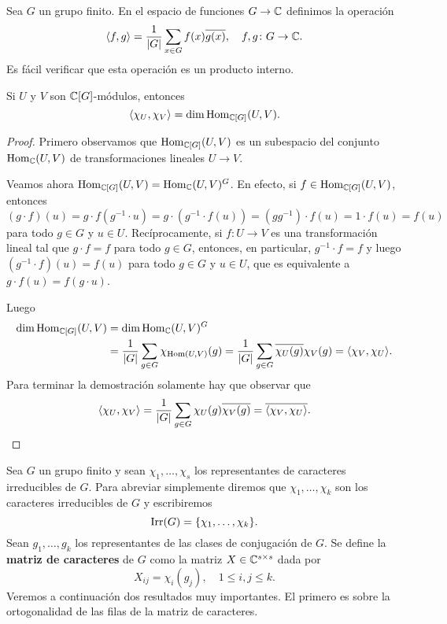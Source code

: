 Sea $G$ un grupo finito. En el espacio de funciones $G\to\mathbb{C}$ definimos la operación
\[
\langle f,g\rangle=\frac{1}{|G|}\sum_{x\in G}f(x)\overline{g(x)},
\quad f,g\colon G\to\mathbb{C}.
\]
Es fácil verificar que esta operación es un producto interno. 

\begin{theorem}
Si $U$ y $V$ son $\mathbb{C}[G]$-módulos, entonces 
\[
\langle\chi_U,\chi_V\rangle=\dim\operatorname{Hom}_{\mathbb{C}[G]}(U,V).
\]
\end{theorem}

\begin{proof}
    Primero observamos que $\operatorname{Hom}_{\mathbb{C}[G]}(U,V)$ es un subespacio del conjunto $\operatorname{Hom}_{\mathbb{C}}(U,V)$ de transformaciones lineales $U\to V$.
    
    Veamos ahora $\operatorname{Hom}_{\mathbb{C}[G]}(U,V)=\operatorname{Hom}_{\mathbb{C}}(U,V)^G$. En efecto, si $f\in\operatorname{Hom}_{\mathbb{C}[G]}(U,V)$, entonces
    \[
    (g\cdot f)(u)=g\cdot f(g^{-1}\cdot u)=g\cdot (g^{-1}\cdot f(u))=(gg^{-1})\cdot f(u)=1\cdot f(u)=f(u)
    \]
    para todo $g\in G$ y $u\in U$. Recíprocamente, si $f\colon U\to V$ es una transformación lineal tal que 
    $g\cdot f=f$ para todo $g\in G$, entonces, en particular, $g^{-1}\cdot f=f$ y luego
    $(g^{-1}\cdot f)(u)=f(u)$ para todo $g\in G$ y $u\in U$, que es equivalente a 
    $g\cdot f(u)=f(g\cdot u)$. 

    Luego
    \begin{align*}
    \dim\operatorname{Hom}_{\mathbb{C}[G]}(U,V)&=\dim\operatorname{Hom}_{\mathbb{C}}(U,V)^G\\
    &=\frac{1}{|G|}\sum_{g\in G}\chi_{\operatorname{Hom}(U,V)}(g)
    =\frac{1}{|G|}\sum_{g\in G}\overline{\chi_U(g)}\chi_V(g)
    =\langle\chi_V,\chi_U\rangle.
    \end{align*}
    Para terminar la demostración solamente hay que observar 
    que 
    \[
    \langle\chi_U,\chi_V\rangle=\frac{1}{|G|}\sum_{g\in G}\chi_U(g)\overline{\chi_V(g)}=\overline{\langle\chi_V,\chi_U\rangle}.\qedhere
    \]
\end{proof}

Sea $G$ un grupo finito y sean $\chi_1,\dots,\chi_s$ los representantes de
caracteres irreducibles de $G$. Para abreviar simplemente diremos que
$\chi_1,\dots,\chi_k$ son los caracteres irreducibles de $G$ y escribiremos
\[
	\operatorname{Irr}(G)=\{\chi_1,\dots,\chi_k\}.
\]
Sean $g_1,\dots,g_k$ los representantes de las clases de
conjugación de $G$. Se define la \textbf{matriz de caracteres} de $G$ como la
matriz $X\in\mathbb{C}^{s\times s}$ dada por
\[
X_{ij}=\chi_i(g_j),\quad
1\leq i,j\leq k.
\]
Veremos a continuación dos resultados muy importantes. El primero es
sobre la ortogonalidad de las filas de la matriz de caracteres. 

